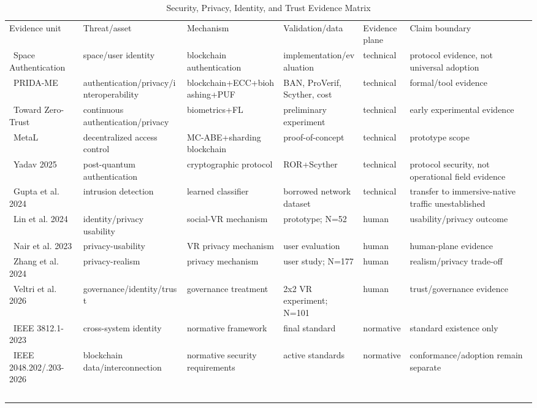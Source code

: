 \begin{table}[!t]\centering\caption{Security, Privacy, Identity, and Trust Evidence Matrix}\label{tab:securityexpanded}\scriptsize\begin{tabularx}{\textwidth}{p{}p{}p{}p{}p{}Y}\toprule Evidence unit & Threat/asset & Mechanism & Validation/data & Evidence plane & Claim boundary \\\ \midrule Space Authentication & space/user identity & blockchain authentication & implementation/evaluation & technical & protocol evidence, not universal adoption \\\ PRIDA-ME & authentication/privacy/interoperability & blockchain+ECC+biohashing+PUF & BAN, ProVerif, Scyther, cost & technical & formal/tool evidence \\\ Toward Zero-Trust & continuous authentication/privacy & biometrics+FL & preliminary experiment & technical & early experimental evidence \\\ MetaL & decentralized access control & MC-ABE+sharding blockchain & proof-of-concept & technical & prototype scope \\\ Yadav 2025 & post-quantum authentication & cryptographic protocol & ROR+Scyther & technical & protocol security, not operational field evidence \\\ Gupta et al. 2024 & intrusion detection & learned classifier & borrowed network dataset & technical & transfer to immersive-native traffic unestablished \\\ Lin et al. 2024 & identity/privacy usability & social-VR mechanism & prototype; N=52 & human & usability/privacy outcome \\\ Nair et al. 2023 & privacy-usability & VR privacy mechanism & user evaluation & human & human-plane evidence \\\ Zhang et al. 2024 & privacy-realism & privacy mechanism & user study; N=177 & human & realism/privacy trade-off \\\ Veltri et al. 2026 & governance/identity/trust & governance treatment & 2x2 VR experiment; N=101 & human & trust/governance evidence \\\ IEEE 3812.1-2023 & cross-system identity & normative framework & final standard & normative & standard existence only \\\ IEEE 2048.202/.203-2026 & blockchain data/interconnection & normative security requirements & active standards & normative & conformance/adoption remain separate \\\ \bottomrule\end{tabularx}\end{table}